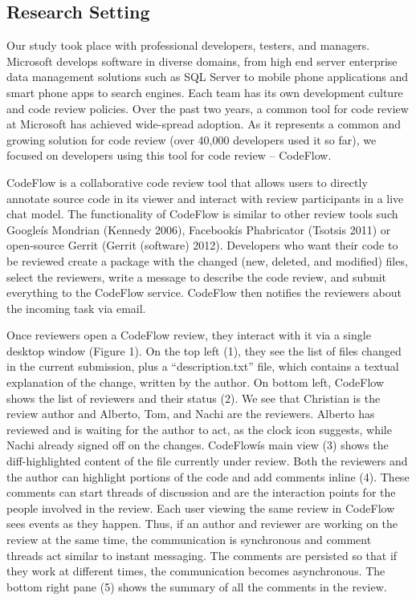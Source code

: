 \documentclass[conference]{IEEEtran}
\begin{document}
\subsection{Research Setting}

Our study took place with professional developers, testers, and managers.
Microsoft develops software in diverse domains, from high end server enterprise
data management solutions such as SQL Server to mobile phone applications and
smart phone apps to search engines. Each team has its own development culture
and code review policies. Over the past two years, a common tool for code
review at Microsoft has achieved wide-spread adoption. As it represents a
common and growing solution for code review (over 40,000 developers used it so
far), we focused on developers using this tool for code review -- CodeFlow. 

CodeFlow is a collaborative code review tool that allows users to directly
annotate source code in its viewer and interact with review participants in a
live chat model. The functionality of CodeFlow is similar to other review tools
such Googleís Mondrian (Kennedy 2006), Facebookís Phabricator (Tsotsis 2011) or
open-source  Gerrit (Gerrit (software) 2012). Developers who want their code to
be reviewed create a package with the changed (new, deleted, and modified)
files, select the reviewers, write a message to describe the code review, and
submit everything to the CodeFlow service. CodeFlow then notifies the reviewers
about the incoming task via email.

Once reviewers open a CodeFlow review, they interact with it via a single
desktop window (Figure 1). On the top left (1), they see the list of files
changed in the current submission, plus a ``description.txt'' file, which
contains a textual explanation of the change, written by the author. On bottom
left, CodeFlow shows the list of reviewers and their status (2). We see that
Christian is the review author and Alberto, Tom, and Nachi are the reviewers.
Alberto has reviewed and is waiting for the author to act, as the clock icon
suggests, while Nachi already signed off on the changes. CodeFlowís main view
(3) shows the diff-highlighted content of the file currently under review. Both
the reviewers and the author can highlight portions of the code and add
comments inline (4). These comments can start threads of discussion and are the
interaction points for the people involved in the review. Each user viewing the
same review in CodeFlow sees events as they happen.  Thus, if an author and
reviewer are working on the review at the same time, the communication is
synchronous and comment threads act similar to instant messaging. The comments
are persisted so that if they work at different times, the communication
becomes asynchronous. The bottom right pane (5) shows the summary of all the
comments in the review. 
\end{document}
